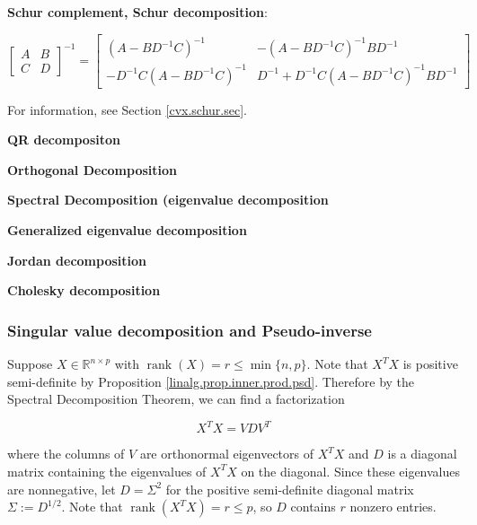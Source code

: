 \textbf{Schur complement, Schur decomposition}: 

\begin{proposition}

\[
\begin{bmatrix}
A & B \\
C & D 
\end{bmatrix}^{-1} = 
\begin{bmatrix}
(A - B D^{-1}C)^{-1} & -(A - BD^{-1}C)^{-1}BD^{-1} \\
-D^{-1}C(A - BD^{-1}C)^{-1} & D^{-1} + D^{-1}C(A - BD^{-1}C)^{-1}BD^{-1}
\end{bmatrix}
\]

\end{proposition}

For information, see Section \ref{cvx.schur.sec}.



\textbf{QR decompositon}

\textbf{Orthogonal Decomposition}

\textbf{Spectral Decomposition (eigenvalue decomposition}

\textbf{Generalized eigenvalue decomposition}

\textbf{Jordan decomposition}

\textbf{Cholesky decomposition}

\subsubsection{Singular value decomposition and Pseudo-inverse}

Suppose \(X \in \mathbb{R}^{n \times p}\) with \(\operatorname{rank}(X) = r \leq \min\{n, p\}\). Note that \(X^TX\) is positive semi-definite by Proposition \ref{linalg.prop.inner.prod.psd}. Therefore by the Spectral Decomposition Theorem, we can find a factorization

\begin{equation}\label{linalg.svd.1.decomp}
X^TX = V D V^T
\end{equation}

where the columns of \(V\) are orthonormal eigenvectors of \(X^TX\) and \(D\) is a diagonal matrix containing the eigenvalues of \(X^TX\) on the diagonal. Since these eigenvalues are nonnegative, let \(D = \Sigma^2\) for the positive semi-definite diagonal matrix \(\Sigma := D^{1/2}\). Note that \(\operatorname{rank}(X^TX) = r \leq p\), so \(D\) contains \( r\) nonzero entries. 

